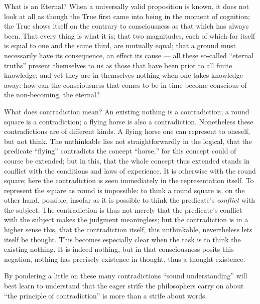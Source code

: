 \documentclass[12pt]{book}
\begin{document}
What is an Eternal? When a universally valid proposition is known, it does not
look at all as though the True first came into being in the moment of cognition;
the True shows itself on the contrary to consciousness as that which has always
been. That every thing is what it is; that two magnitudes, each of which for
itself is equal to one and the same third, are mutually equal; that a ground must
necessarily have its consequence, an effect its cause — all these so-called
``eternal truths'' present themselves to us as those that have been prior to all
finite knowledge; and yet they are in themselves nothing when one takes knowledge
away: how can the consciousness that comes to be in time become conscious of the
non-becoming, the eternal?

What does contradiction mean? An existing nothing is a contradiction; a round
square is a contradiction; a flying horse is also a contradiction. Nonetheless
these contradictions are of different kinds. A flying horse one can represent to
oneself, but not think. The unthinkable lies not straightforwardly in the logical,
that the predicate ``flying'' contradicts the concept ``horse,'' for this concept
could of course be extended; but in this, that the whole concept thus extended
stands in conflict with the conditions and laws of experience. It is otherwise
with the round square; here the contradiction is seen immediately in the
representation itself. To represent the square as round is impossible: to think a
round square is, on the other hand, possible, insofar as it is possible to think
the predicate's \emph{conflict} with the subject. The contradiction is thus not
merely that the predicate's conflict with the subject makes the judgment
meaningless; but the contradiction is in a higher sense this, that the
contradiction itself, this unthinkable, nevertheless lets itself be thought. This
becomes especially clear when the task is to think the existing nothing. It is
indeed nothing, but in that consciousness posits this negation, nothing has
precisely existence in thought, thus a thought existence.

By pondering a little on these many contradictions ``sound understanding'' will
best learn to understand that the eager strife the philosophers carry on about
``the principle of contradiction'' is more than a strife about words.
\end{document}
